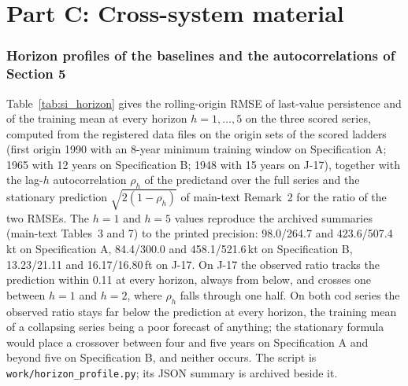 \FloatBarrier
\part*{Part C: Cross-system material}

\section{Horizon profiles of the baselines and the autocorrelations of Section 5}\label{si:horizon}

Table~\ref{tab:si_horizon} gives the rolling-origin RMSE of last-value persistence and of the training mean at every horizon $h=1,\dots,5$ on the three scored series, computed from the registered data files on the origin sets of the scored ladders (first origin 1990 with an 8-year minimum training window on Specification A; 1965 with 12 years on Specification B; 1948 with 15 years on J-17), together with the lag-$h$ autocorrelation $\rho_h$ of the predictand over the full series and the stationary prediction $\sqrt{2(1-\rho_h)}$ of main-text Remark~2 for the ratio of the two RMSEs. The $h=1$ and $h=5$ values reproduce the archived summaries (main-text Tables~3 and 7) to the printed precision: 98.0/264.7 and 423.6/507.4\,kt on Specification A, 84.4/300.0 and 458.1/521.6\,kt on Specification B, 13.23/21.11 and 16.17/16.80\,ft on J-17. On J-17 the observed ratio tracks the prediction within 0.11 at every horizon, always from below, and crosses one between $h=1$ and $h=2$, where $\rho_h$ falls through one half. On both cod series the observed ratio stays far below the prediction at every horizon, the training mean of a collapsing series being a poor forecast of anything; the stationary formula would place a crossover between four and five years on Specification A and beyond five on Specification B, and neither occurs. The script is \texttt{work/horizon\_profile.py}; its JSON summary is archived beside it.

\begin{table}[!htb]
\centering\small
\caption{Horizon profile of the two baselines on the scored origin sets. RMSE in kt (cod) and ft (J-17); ratio $=$ RMSE(persistence)/RMSE(training mean); $\rho_h$ is the lag-$h$ autocorrelation of the predictand over the full series.}
\label{tab:si_horizon}

\end{table}


